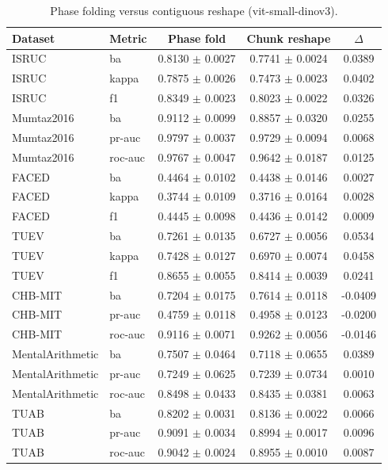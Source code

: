 \begin{table}[tbp]\centering\scriptsize\caption{Phase folding versus contiguous reshape (vit-small-dinov3).}\begin{tabular}{@{}l l c c c@{}}\toprule Dataset & Metric & Phase fold & Chunk reshape & $\Delta$ \\ \midrule
ISRUC & ba & 0.8130 $\pm$ 0.0027 & 0.7741 $\pm$ 0.0024 & 0.0389 \\
ISRUC & kappa & 0.7875 $\pm$ 0.0026 & 0.7473 $\pm$ 0.0023 & 0.0402 \\
ISRUC & f1 & 0.8349 $\pm$ 0.0023 & 0.8023 $\pm$ 0.0022 & 0.0326 \\
Mumtaz2016 & ba & 0.9112 $\pm$ 0.0099 & 0.8857 $\pm$ 0.0320 & 0.0255 \\
Mumtaz2016 & pr-auc & 0.9797 $\pm$ 0.0037 & 0.9729 $\pm$ 0.0094 & 0.0068 \\
Mumtaz2016 & roc-auc & 0.9767 $\pm$ 0.0047 & 0.9642 $\pm$ 0.0187 & 0.0125 \\
FACED & ba & 0.4464 $\pm$ 0.0102 & 0.4438 $\pm$ 0.0146 & 0.0027 \\
FACED & kappa & 0.3744 $\pm$ 0.0109 & 0.3716 $\pm$ 0.0164 & 0.0028 \\
FACED & f1 & 0.4445 $\pm$ 0.0098 & 0.4436 $\pm$ 0.0142 & 0.0009 \\
TUEV & ba & 0.7261 $\pm$ 0.0135 & 0.6727 $\pm$ 0.0056 & 0.0534 \\
TUEV & kappa & 0.7428 $\pm$ 0.0127 & 0.6970 $\pm$ 0.0074 & 0.0458 \\
TUEV & f1 & 0.8655 $\pm$ 0.0055 & 0.8414 $\pm$ 0.0039 & 0.0241 \\
CHB-MIT & ba & 0.7204 $\pm$ 0.0175 & 0.7614 $\pm$ 0.0118 & -0.0409 \\
CHB-MIT & pr-auc & 0.4759 $\pm$ 0.0118 & 0.4958 $\pm$ 0.0123 & -0.0200 \\
CHB-MIT & roc-auc & 0.9116 $\pm$ 0.0071 & 0.9262 $\pm$ 0.0056 & -0.0146 \\
MentalArithmetic & ba & 0.7507 $\pm$ 0.0464 & 0.7118 $\pm$ 0.0655 & 0.0389 \\
MentalArithmetic & pr-auc & 0.7249 $\pm$ 0.0625 & 0.7239 $\pm$ 0.0734 & 0.0010 \\
MentalArithmetic & roc-auc & 0.8498 $\pm$ 0.0433 & 0.8435 $\pm$ 0.0381 & 0.0063 \\
TUAB & ba & 0.8202 $\pm$ 0.0031 & 0.8136 $\pm$ 0.0022 & 0.0066 \\
TUAB & pr-auc & 0.9091 $\pm$ 0.0034 & 0.8994 $\pm$ 0.0017 & 0.0096 \\
TUAB & roc-auc & 0.9042 $\pm$ 0.0024 & 0.8955 $\pm$ 0.0010 & 0.0087 \\

\end{tabular}
\end{table}
